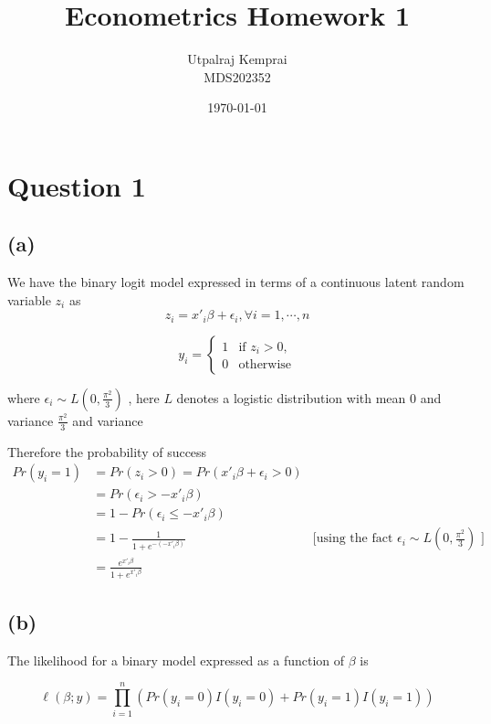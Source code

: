\documentclass[a4paper]{article}
\begin{document}
\title{Econometrics Homework 1}
\author{Utpalraj Kemprai \\
MDS202352}
\date{\today}

\maketitle

\newpage

\section*{Question 1}
\subsection*{(a)}

We have the binary logit model expressed in terms of a continuous
latent random variable $z_{i}$ as 
\[
    z_{i} = x'_{i}\beta + \epsilon_{i}, \forall i = 1, \cdots, n
\] 

 \[
y_{i} =
\begin{cases} 
1 & \text{if } z_{i} > 0, \\
0 & \text{otherwise}
\end{cases}
\] 

where $\epsilon_{i} \sim L(0,\frac{\pi^2}{3})$ , here $L$ denotes a logistic distribution with mean 0 and variance $\frac{\pi^2}{3}$
and variance

\vspace{4pt}
Therefore the probability of success
\begin{align*}
     Pr(y_{i} = 1) &= Pr(z_{i} > 0) = Pr(x'_{i}\beta + \epsilon_{i} > 0) \\
    &= Pr(\epsilon_{i} > - x'_{i}\beta) \\
    &= 1 - Pr(\epsilon_{i} \leq - x'_{i}\beta) \\
    &= 1 - \frac{1}{1 + e^{- (-x'_{i}\beta)}} & \text{[using the fact $\epsilon_{i} \sim L(0, \frac{\pi^2}{3})$ ]} \\
    &= \frac{e^{x'_{i}\beta}}{ 1+ e^{{x'_{i}\beta}}}
\end{align*}

\subsection*{(b)}
The likelihood for a binary model expressed as a function of $\beta$ is

\[
    \ell (\beta;y) = \prod_{i=1}^{n} ({Pr(y_{i}=0)I(y_{i} = 0) + Pr(y_{i}=1)I(y_{i} = 1)})
\]
\end{document}
